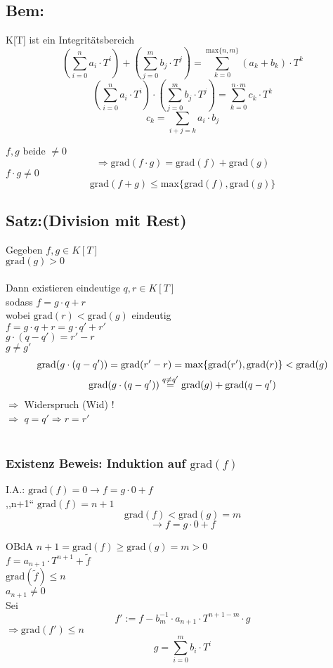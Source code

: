 \documentclass[titlepage,12pt,a4paper,ngerman]{report}
\newcommand{\tx}[1]{\textrm{#1}}
\newcommand{\grad}{\tx{grad}}
\begin{document}
\subsection{Bem:} K[T] ist ein Integritätsbereich 
$$(\sum^{n}_{i=0} a_{i}\cdot T^i)+(\sum^{m}_{j=0} b_{j}\cdot T^j) = \sum^{\textrm{max}\{n,m\}}_{k=0} (a_{k}+b_{k})\cdot T^k$$
$$(\sum_{i=0}^{n}a_{i}\cdot T^{i})\cdot (\sum_{j=0}^{m}b_{j}\cdot T^{j}) = \sum_{k=0}^{n\cdot m}c_{k}\cdot T^{k}$$
$$ c_{k}=\sum_{i+j=k}a_{i}\cdot b_{j}$$

\noindent $f,g$ beide $\neq 0$
$$\Rightarrow \grad(f\cdot g) = \grad(f) + \grad(g)$$
$f\cdot g \neq 0$
$$\grad (f + g) \le \textrm{max}\{\grad(f), \grad(g)\}$$
\subsection{Satz:(Division mit Rest)}
Gegeben $f,g \in K[T]$\\
$\grad(g)> 0$ \\\\
Dann existieren eindeutige $q,r\in K[T]$\\
sodass $f=g\cdot q+r$\\
wobei $\grad(r) < \grad(g)$ eindeutig\\
$f = g\cdot q+r = g\cdot q' + r'$\\
$g\cdot(q-q') = r' - r$\\
$g\neq g'$
\begin{gather*}
\grad(g\cdot(q-q')) = \grad( r' - r) = \textrm{max}\{ \grad(r'),\grad(r) \} < \grad(g) \\ \grad(g\cdot(q-q')) \buildrel q\neq q'\over = \grad(g) + \grad(q-q') 
\end{gather*}
$\Rightarrow$ Widerspruch (Wid) !\\
$\Rightarrow$ $q = q' \Rightarrow r = r'$\\\\
\subsubsection{Existenz Beweis: Induktion auf $\grad(f)$}
I.A.: $\grad(f)= 0 \rightarrow f = g\cdot0 + f$\\
,,n+1`` $\grad(f)= n+1$
$$\grad(f) < \grad(g) = m$$
$$\rightarrow f = g\cdot 0 + f$$

OBdA $n+1 = \grad(f)\ge \grad(g) = m > 0$\\
$f = a_{n+1} \cdot  T^ {n+1} + \tilde{f}$\\
$\grad(\tilde{f}) \le n$\\
$ a_{n+1} \neq 0$\\
Sei $$f' := f - b_{m}^{-1}\cdot  a_{n+1} \cdot  T^{n+1-m} \cdot  g$$
$\Rightarrow \grad(f') \le n$
$$ g= \sum_{i=0}^{m} b_{i} \cdot  T^i$$
\end{document}
